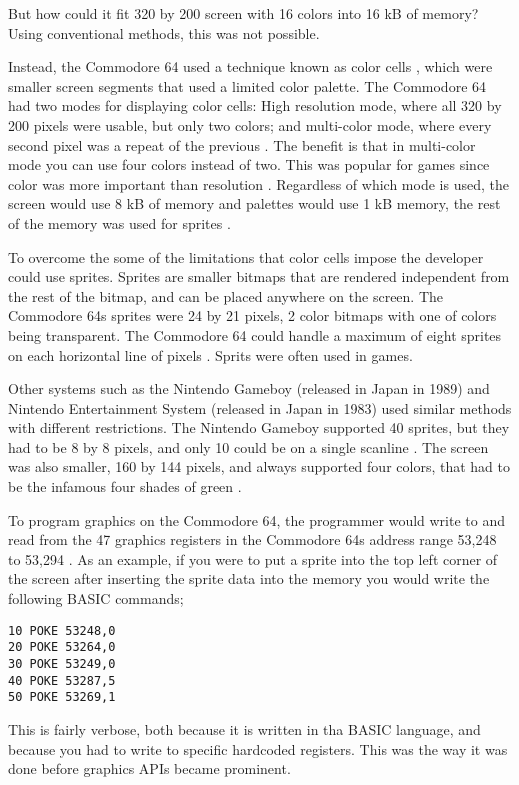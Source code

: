 But how could it fit 320 by 200 screen with 16 colors into 16 kB of memory?
Using conventional methods, this was not possible.

Instead, the Commodore 64 used a technique known as color cells \cite{commodore1983commodore}, which were smaller screen segments that used a limited color palette.
The Commodore 64 had two modes for displaying color cells: High resolution mode, where all 320 by 200 pixels were usable, but only two colors; and multi-color mode, where every second pixel was a repeat of the previous \cite{commodore1983commodore}.
The benefit is that in multi-color mode you can use four colors instead of two.
This was popular for games since color was more important than resolution \cite{bogdan2014games}.
Regardless of which mode is used, the screen would use 8 kB of memory and palettes would use 1 kB memory, the rest of the memory was used for sprites \cite{commodore1983commodore}.

To overcome the some of the limitations that color cells impose the developer could use sprites.
Sprites are smaller bitmaps that are rendered independent from the rest of the bitmap, and can be placed anywhere on the screen.
The Commodore 64s sprites were 24 by 21 pixels, 2 color bitmaps with one of colors being transparent.
The Commodore 64 could handle a maximum of eight sprites on each horizontal line of pixels \cite{commodore1983commodore}.
Sprits were often used in games.

Other systems such as the Nintendo Gameboy (released in Japan in 1989) and Nintendo Entertainment System (released in Japan in 1983) used similar methods with different restrictions.
The Nintendo Gameboy supported 40 sprites, but they had to be 8 by 8 pixels, and only 10 could be on a single scanline \cite{nintendo1999gameboy}. 
The screen was also smaller, 160 by 144 pixels, and always supported four colors, that had to be the infamous four shades of green \cite{nintendo1999gameboy}.

To program graphics on the Commodore 64, the programmer would write to and read from the 47 graphics registers in the Commodore 64s address range 53,248 to 53,294 \cite{commodore1983commodore}.
As an example, if you were to put a sprite into the top left corner of the screen after inserting the sprite data into the memory you would write the following BASIC commands; 

\begin{lstlisting}[caption={Small BASIC program that sets the coordinate of sprite 0 to (0,0) (line 1-3), sets the color to green (line 4), and enables sprite 0 it (line 5). Line 5 is a bit mask telling the graphics chip which sprits should be shown.}]
10 POKE 53248,0
20 POKE 53264,0
30 POKE 53249,0
40 POKE 53287,5
50 POKE 53269,1
\end{lstlisting}
This is fairly verbose, both because it is written in tha BASIC language, and because you had to write to specific hardcoded registers.
This was the way it was done before graphics \glspl{API} became prominent.

